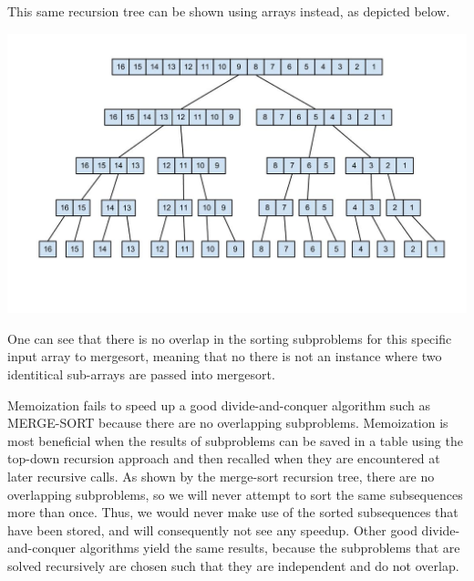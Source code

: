 \documentclass[11pt]{article}
\begin{document}
\begin{sol}
This same recursion tree can be shown using arrays instead, as depicted below.

\begin{center}
	\includegraphics[width=150mm]{msort16.jpg}
\end{center}

One can see that there is no overlap in the sorting subproblems for this specific input array to mergesort, meaning that no there is not an instance where two identitical sub-arrays are passed into mergesort. 

Memoization fails to speed up a good divide-and-conquer algorithm such as MERGE-SORT because there are no overlapping subproblems. Memoization is most beneficial when the results of subproblems can be saved in a table using the top-down recursion approach and then recalled when they are encountered at later recursive calls. As shown by the merge-sort recursion tree, there are no overlapping subproblems, so we will never attempt to sort the same subsequences more than once. Thus, we would never make use of the sorted subsequences that have been stored, and will consequently not see any speedup. Other good divide-and-conquer algorithms yield the same results, because the subproblems that are solved recursively are chosen such that they are independent and do not overlap. 
\end{sol}
\end{document}
